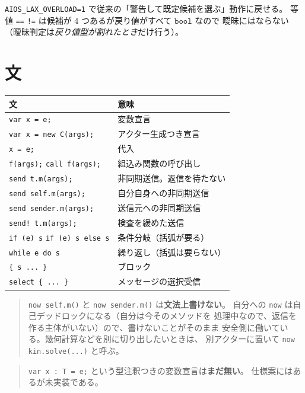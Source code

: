 \documentclass[11pt,a4paper]{ltjsarticle}
\newcommand{\ty}[1]{\ensuremath{\mathtt{#1}}}
\begin{document}
\texttt{AIOS\_LAX\_OVERLOAD=1} で従来の「警告して既定候補を選ぶ」動作に戻せる。
等値 \texttt{==} \texttt{!=} は候補が 4 つあるが戻り値がすべて \ty{bool} なので
曖昧にはならない（曖昧判定は\emph{戻り値型が割れたとき}だけ行う）。

\section{文}

\begin{center}
\begin{tabular}{@{}ll@{}}
\toprule
文 & 意味 \\
\midrule
\texttt{var x = e;} & 変数宣言 \\
\texttt{var x = new C(args);} & アクター生成つき宣言 \\
\texttt{x = e;} & 代入 \\
\texttt{f(args);} \quad \texttt{call f(args);} & 組込み関数の呼び出し \\
\texttt{send t.m(args);} & 非同期送信。返信を待たない \\
\texttt{send self.m(args);} & 自分自身への非同期送信 \\
\texttt{send sender.m(args);} & 送信元への非同期送信 \\
\texttt{send! t.m(args);} & 検査を緩めた送信 \\
\texttt{if (e) s} \quad \texttt{if (e) s else s} & 条件分岐（括弧が要る） \\
\texttt{while e do s} & 繰り返し（括弧は要らない） \\
\texttt{\{ s ... \}} & ブロック \\
\texttt{select \{ ... \}} & メッセージの選択受信 \\
\bottomrule
\end{tabular}
\end{center}

\begin{quote}\small
\texttt{now self.m()} と \texttt{now sender.m()} は\textbf{文法上書けない}。
自分への \texttt{now} は自己デッドロックになる（自分は今そのメソッドを
処理中なので、返信を作る主体がいない）ので、書けないことがそのまま
安全側に働いている。幾何計算などを別に切り出したいときは、
別アクターに置いて \texttt{now kin.solve(...)} と呼ぶ。
\end{quote}

\begin{quote}\small
\texttt{var x : T = e;} という型注釈つきの変数宣言は\textbf{まだ無い}。
仕様案にはあるが未実装である。
\end{quote}
\end{document}
